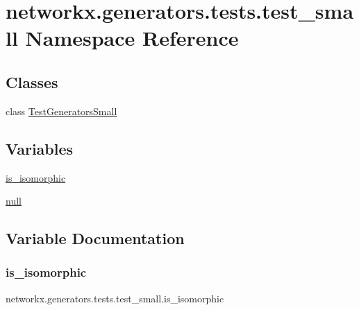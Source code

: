 \hypertarget{namespacenetworkx_1_1generators_1_1tests_1_1test__small}{}\section{networkx.\+generators.\+tests.\+test\+\_\+small Namespace Reference}
\label{namespacenetworkx_1_1generators_1_1tests_1_1test__small}
\subsection*{Classes}
\begin{DoxyCompactItemize}
\item 
class \hyperlink{classnetworkx_1_1generators_1_1tests_1_1test__small_1_1TestGeneratorsSmall}{Test\+Generators\+Small}
\end{DoxyCompactItemize}
\subsection*{Variables}
\begin{DoxyCompactItemize}
\item 
\hyperlink{namespacenetworkx_1_1generators_1_1tests_1_1test__small_a856835241a43bdd9f878803455a6cefb}{is\+\_\+isomorphic}
\item 
\hyperlink{namespacenetworkx_1_1generators_1_1tests_1_1test__small_a1c5e8877c87830dbde8c26100b99750e}{null}
\end{DoxyCompactItemize}


\subsection{Variable Documentation}
\mbox{\label{namespacenetworkx_1_1generators_1_1tests_1_1test__small_a856835241a43bdd9f878803455a6cefb}} 
\subsubsection{\texorpdfstring{is\+\_\+isomorphic}{is\_isomorphic}}
{\footnotesize\ttfamily networkx.\+generators.\+tests.\+test\+\_\+small.\+is\+\_\+isomorphic}

